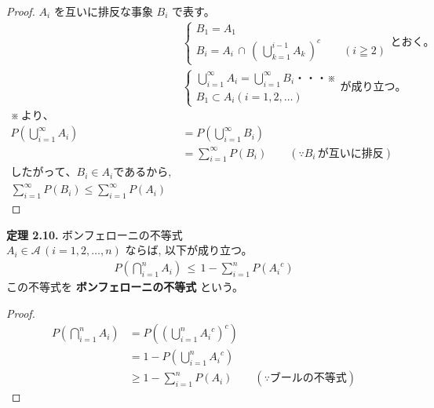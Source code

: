 \documentclass[dvipdfmx,10pt, a4j]{jarticle}
\theoremstyle{definition}
\begin{document}
    \newpage
    \begin{proof}
        $A_i$ を互いに排反な事象 $B_i$ で表す。\\
        \begin{align*}
            & \begin{cases}
                  B_1 = A_1\\
                  B_i = A_i \, \cap \, (\, \bigcup_{k=1}^{i-1}{A_k} \, )^{c} \qquad  (i \geqq 2)
            \end{cases}
            とおく。\\
            & \begin{cases}
                  \bigcup_{i=1}^{\infty}{A_i} = \bigcup_{i=1}^{\infty}{B_i} ・・・※\\
                  B_1 \subset A_i (i = 1, 2, \dots)
            \end{cases}
            が成り立つ。\\
            ※\,より、\\
            P(\bigcup_{i=1}^{\infty}{A_i}) &= P(\bigcup_{i=1}^{\infty}{B_i})\\
            &= \sum_{i=1}^{\infty}{P(B_i)} \qquad (\because{B_i\, が互いに排反})\\
            したがって、B_i \in A_i であるから,\\
            \sum_{i=1}^{\infty}{P(B_i)} \leq \sum_{i=1}^{\infty}{P(A_i)}
        \end{align*}
    \end{proof}

    \noindent
    \textbf{定理 2.10.} ボンフェローニの不等式\\
    $A_i \in \mathcal{A}\, (i = 1, 2, \dots, n)$ ならば, 以下が成り立つ。\\
    \begin{align*}
        P(\bigcap_{i=1}^{n}{A_i}) \, \leq \, 1 - \sum_{i=1}^{n}P({A_i}^c)
    \end{align*}
    この不等式を \textbf{ボンフェローニの不等式} という。\\
    \begin{proof}
        \begin{align*}
            P(\bigcap_{i=1}^{n}{A_i}) &= P((\bigcup_{i=1}^{n}{{A_i}^c})^{c})\\
            &= 1 - P(\bigcup_{i=1}^{n}{{A_i}^c})\\
            &\geq 1 - \sum_{i=1}^{n}P(A_i) \qquad (\because{ブールの不等式})
        \end{align*}
    \end{proof}
\end{document}
